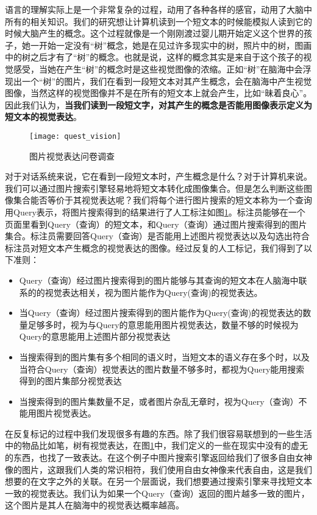 语言的理解实际上是一个非常复杂的过程，动用了各种各样的感官，动用了大脑中所有的相关知识。我们的研究想让计算机读到一个短文本的时候能模拟人读到它的时候大脑产生的概念。这个过程就像是一个刚刚渡过婴儿期开始定义这个世界的孩子，她一开始一定没有“树”概念，她是在见过许多现实中的树，照片中的树，图画中的树之后才有了“树”的概念。也就是说，这样的概念其实是来自于这个孩子的视觉感受，当她在产生“树”的概念时是这些视觉图像的浓缩。正如“树”在脑海中会浮现出一个“树”的图片，我们在看到一段短文本对其产生概念，会在脑海中产生视觉图像，当然这样的视觉图像并不是在所有的短文本上就会产生，比如“昧着良心”。因此我们认为，\textbf{当我们读到一段短文字，对其产生的概念是否能用图像表示定义为短文本的视觉表达}。
\begin{figure}[ht]
\centering
\texttt{[image: quest\_vision]}
\caption{图片视觉表达问卷调查} \label{fig:quest_vision}
\end{figure}
对于对话系统来说，它在看到一段短文本时，产生概念是什么？对于计算机来说。我们可以通过图片搜索引擎轻易地将短文本转化成图像集合。但是怎么判断这些图像集合能否等价于其视觉表达呢？我们将每个进行图片搜索的短文本称为一个查询用Query表示，将图片搜索得到的结果进行了人工标注如图\ref{fig:quest_vision}。标注员能够在一个页面里看到Query（查询）的短文本，和Query（查询）通过图片搜索得到的图片集合。标注员需要回答Query（查询）是否能用上述图片视觉表达以及勾选出符合标注员对短文本产生概念的视觉表达的图像。经过反复的人工标记，我们得到了以下准则：
\begin{itemize}
	\item     Query（查询）经过图片搜索得到的图片能够与其查询的短文本在人脑海中联系的的视觉表达相关，视为图片能作为Query(查询)的视觉表达。
	\item  当Query（查询）经过图片搜索得到的图片能作为Query(查询)的视觉表达的数量足够多时，视为与Query的意思能用图片视觉表达，数量不够的时候视为Query的意思能用上述图片部分视觉表达
	\item   当搜索得到的图片集有多个相同的语义时，当短文本的语义存在多个时，以及当符合Query（查询）视觉表达的图片数量不够多时，都视为Query能用搜索得到的图片集部分视觉表达
	\item    当搜索得到的图片集数量不足，或者图片杂乱无章时，视为Query（查询）不能用图片视觉表达。
\end{itemize}

在反复标记的过程中我们发现很多有趣的东西。除了我们很容易联想到的一些生活中的物品比如笔，树有视觉表达，在图\ref{fig:quest_vision}中，我们定义的一些在现实中没有的虚无的东西，也找了一致表达。在这个例子中图片搜索引擎返回给我们了很多自由女神像的图片，这跟我们人类的常识相符，我们使用自由女神像来代表自由，这是我们想要的在文字之外的关联。在另一个层面说，我们想要通过搜索引擎来寻找短文本一致的视觉表达。我们认为如果一个Query（查询）返回的图片越多一致的图片，这个图片是其人在脑海中的视觉表达概率越高。

